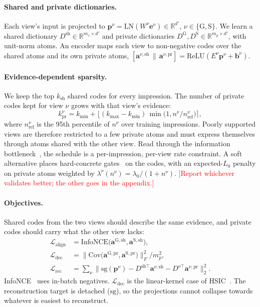\documentclass[sigconf,anonymous,review]{acmart}
\newcommand{\tbd}[1]{\textcolor{red}{[#1]}}
\newcommand{\R}{\mathbb{R}}
\newcommand{\bm}[1]{\boldsymbol{#1}}
\begin{document}
\paragraph{Shared and private dictionaries.}
Each view's input is projected to $\bm{p}^{\nu} = \mathrm{LN}(W^{\nu}\bm{e}^{\nu}) \in \R^{d'}$,
$\nu \in \{\mathrm{G}, \mathrm{S}\}$. We learn a shared dictionary
$D^{\mathrm{sh}} \in \R^{m_s \times d'}$ and private dictionaries
$D^{\mathrm{G}}, D^{\mathrm{S}} \in \R^{m_p \times d'}$, with unit-norm atoms.
An encoder maps each view to non-negative codes over the shared atoms and its
own private atoms,
$[\bm{a}^{\nu,\mathrm{sh}} \,\|\, \bm{a}^{\nu,\mathrm{pr}}] = \mathrm{ReLU}(E^{\nu}\bm{p}^{\nu} + \bm{b}^{\nu})$.

\paragraph{Evidence-dependent sparsity.}
We keep the top $k_{\mathrm{sh}}$ shared codes for every impression. The
number of private codes kept for view $\nu$ grows with that view's evidence:
\begin{equation}
  k^{\nu}_{\mathrm{pr}} = k_{\min} + \Big\lfloor (k_{\max} - k_{\min})\,
     \min\!\big(1, n^{\nu}/n^{\nu}_{\mathrm{ref}}\big) \Big\rceil,
\end{equation}
where $n^{\nu}_{\mathrm{ref}}$ is the 95th percentile of $n^{\nu}$ over
training impressions. Poorly supported views are therefore restricted to a few
private atoms and must express themselves through atoms shared with the other
view. Read through the information bottleneck~\cite{tishby2000ib,alemi2017vib},
the schedule is a per-impression, per-view rate constraint. A soft alternative
places hard-concrete gates~\cite{louizos2018l0} on the codes, with an expected-$L_0$
penalty on private atoms weighted by $\lambda^{\nu}(n^{\nu}) = \lambda_0/(1+n^{\nu})$.
\tbd{Report whichever validates better; the other goes in the appendix.}

\paragraph{Objectives.}
Shared codes from the two views should describe the same evidence, and private
codes should carry what the other view lacks:
\begin{align}
  \mathcal{L}_{\mathrm{align}} &= \mathrm{InfoNCE}\big(\bm{a}^{\mathrm{G},\mathrm{sh}}, \bm{a}^{\mathrm{S},\mathrm{sh}}\big), \\
  \mathcal{L}_{\mathrm{dec}}   &= \big\lVert \mathrm{Cov}\big(\bm{a}^{\mathrm{G},\mathrm{pr}}, \bm{a}^{\mathrm{S},\mathrm{pr}}\big) \big\rVert_F^2 / m_p^2, \\
  \mathcal{L}_{\mathrm{rec}}   &= \textstyle\sum_{\nu} \big\lVert \mathrm{sg}(\bm{p}^{\nu}) - D^{\mathrm{sh}\top}\bm{a}^{\nu,\mathrm{sh}} - D^{\nu\top}\bm{a}^{\nu,\mathrm{pr}} \big\rVert_2^2 .
\end{align}
InfoNCE~\cite{oord2018infonce} uses in-batch negatives. $\mathcal{L}_{\mathrm{dec}}$
is the linear-kernel case of HSIC~\cite{gretton2005hsic}. The reconstruction
target is detached ($\mathrm{sg}$), so the projections cannot collapse towards
whatever is easiest to reconstruct.
\end{document}
